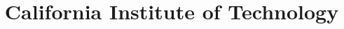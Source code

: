 \documentclass[10pt,letterpaper,twocolumn,twosided]{article}
\begin{document}
\title{California Institute of Technology}
\author{}
\maketitle
\tableofcontents
{}
\end{document}
